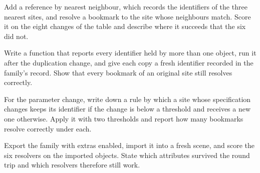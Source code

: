 \begin{exercise}
Add a reference by nearest neighbour, which records the identifiers of the three nearest sites, and resolve a bookmark to the site whose neighbours match. Score it on the eight changes of the table and describe where it succeeds that the six did not.
\end{exercise}

\begin{exercise}
Write a function that reports every identifier held by more than one object, run it after the duplication change, and give each copy a fresh identifier recorded in the family's record. Show that every bookmark of an original site still resolves correctly.
\end{exercise}

\begin{exercise}
For the parameter change, write down a rule by which a site whose specification changes keeps its identifier if the change is below a threshold and receives a new one otherwise. Apply it with two thresholds and report how many bookmarks resolve correctly under each.
\end{exercise}

\begin{exercise}
Export the family with extras enabled, import it into a fresh scene, and score the six resolvers on the imported objects. State which attributes survived the round trip and which resolvers therefore still work.
\end{exercise}
